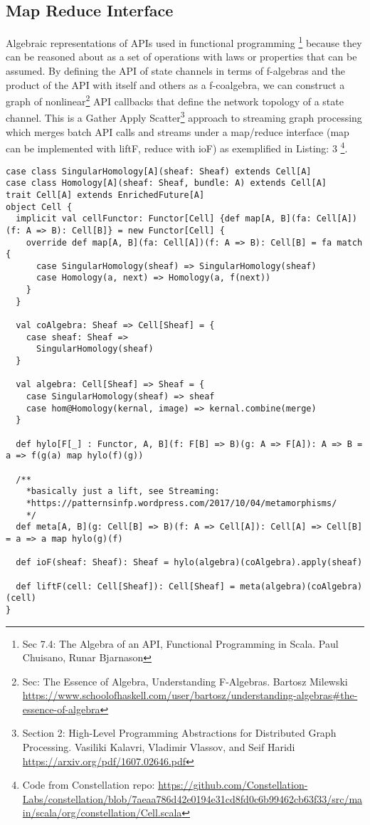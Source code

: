 \documentclass{article}
\begin{document}
\subsection{Map Reduce Interface} 
Algebraic representations of APIs used in functional programming \footnote{Sec 7.4: The Algebra of an API, Functional Programming in Scala. Paul Chuisano, Runar Bjarnason} because they can be reasoned about as a set of operations with laws or properties that can be assumed. By defining the API of state channels in terms of f-algebras and the product of the API with itself and others as a f-coalgebra, we can construct a graph of nonlinear\footnote{Sec: The Essence of Algebra, Understanding F-Algebras. Bartosz Milewski \url{https://www.schoolofhaskell.com/user/bartosz/understanding-algebras#the-essence-of-algebra}} API callbacks that define the network topology of a state channel. This is a Gather Apply Scatter\footnote{Section 2: High-Level Programming Abstractions for Distributed Graph Processing. Vasiliki Kalavri, Vladimir Vlassov, and Seif Haridi \url{https://arxiv.org/pdf/1607.02646.pdf}} approach to streaming graph processing which merges batch API calls and streams under a map/reduce interface (map can be implemented with liftF, reduce with ioF) as exemplified in Listing: 3 \footnote{Code from Constellation repo: \url{https://github.com/Constellation-Labs/constellation/blob/7aeaa786d42e0194e31cd8fd0c6b99462cb63f33/src/main/scala/org/constellation/Cell.scala}}. 
\begin{lstlisting}[caption={Recursion Schemes for combining application APIs in Constellation},captionpos=b,style=myScalastyle]
case class SingularHomology[A](sheaf: Sheaf) extends Cell[A]
case class Homology[A](sheaf: Sheaf, bundle: A) extends Cell[A]
trait Cell[A] extends EnrichedFuture[A]
object Cell {
  implicit val cellFunctor: Functor[Cell] {def map[A, B](fa: Cell[A])(f: A => B): Cell[B]} = new Functor[Cell] {
    override def map[A, B](fa: Cell[A])(f: A => B): Cell[B] = fa match {
      case SingularHomology(sheaf) => SingularHomology(sheaf)
      case Homology(a, next) => Homology(a, f(next))
    }
  }

  val coAlgebra: Sheaf => Cell[Sheaf] = {
    case sheaf: Sheaf =>
      SingularHomology(sheaf)
  }
  
  val algebra: Cell[Sheaf] => Sheaf = {
    case SingularHomology(sheaf) => sheaf
    case hom@Homology(kernal, image) => kernal.combine(merge)
  }

  def hylo[F[_] : Functor, A, B](f: F[B] => B)(g: A => F[A]): A => B = a => f(g(a) map hylo(f)(g))

  /**
    *basically just a lift, see Streaming: 
    *https://patternsinfp.wordpress.com/2017/10/04/metamorphisms/
    */
  def meta[A, B](g: Cell[B] => B)(f: A => Cell[A]): Cell[A] => Cell[B] = a => a map hylo(g)(f)

  def ioF(sheaf: Sheaf): Sheaf = hylo(algebra)(coAlgebra).apply(sheaf)

  def liftF(cell: Cell[Sheaf]): Cell[Sheaf] = meta(algebra)(coAlgebra)(cell)
}
\end{lstlisting}
\end{document}
